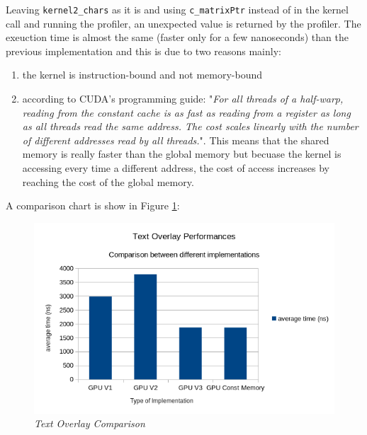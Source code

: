 \documentclass[paper=a4, fontsize=10pt]{scrartcl}	%
\begin{document}
Leaving \texttt{kernel2\_chars} as it is and using \texttt{c\_matrixPtr} instead of  in the kernel call and running the profiler, an unexpected value is returned by the profiler. The exeuction time is almost the same (faster only for a few nanoseconds) than the previous implementation and this is due to two reasons mainly:

\begin{enumerate}
	\item the kernel is instruction-bound and not memory-bound
	\item according to CUDA's programming guide: "\textit{For all threads of a half-warp, reading from the constant cache is as fast as reading from a register as long as all threads read the same address. The cost scales linearly with the number of different addresses read by all threads.}". This means that the shared memory is really faster than the global memory but becuase the kernel is accessing every time a different address, the cost of access increases by reaching the cost of the global memory.
\end{enumerate}

A comparison chart is show in Figure \ref{fig:chart10}:

	\begin{figure}[H]
		\centering
		\includegraphics[width=0.9\linewidth]{images/chart10.png}
		\caption{\textit{Text Overlay Comparison}}
		\label{fig:chart10}
	\end{figure}
\end{document}
